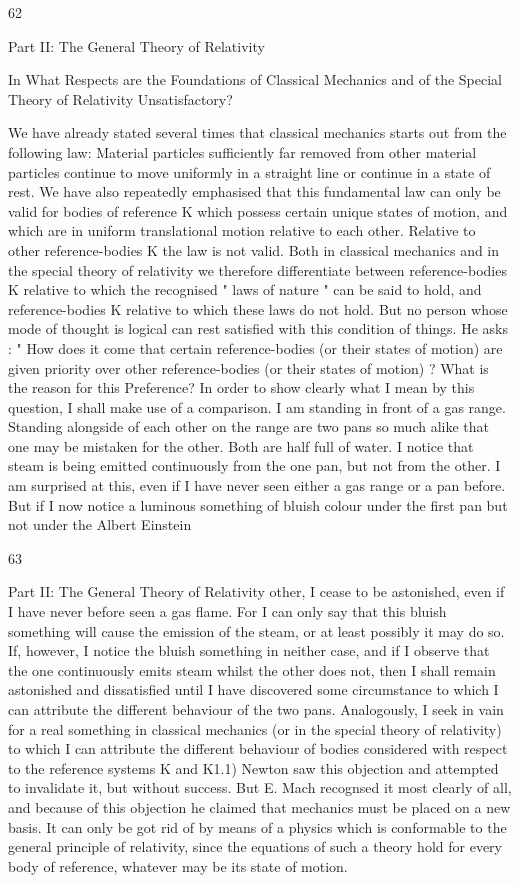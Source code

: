 \documentclass{article}
\begin{document}
62

Part II: The General Theory of Relativity

In What Respects are the
Foundations of Classical
Mechanics and of the Special
Theory of Relativity
Unsatisfactory?

We have already stated several times that classical mechanics starts out from the
following law: Material particles sufficiently far removed from other material particles
continue to move uniformly in a straight line or continue in a state of rest. We have also
repeatedly emphasised that this fundamental law can only be valid for bodies of reference K
which possess certain unique states of motion, and which are in uniform translational
motion relative to each other. Relative to other reference-bodies K the law is not valid. Both
in classical mechanics and in the special theory of relativity we therefore differentiate
between reference-bodies K relative to which the recognised " laws of nature " can be said
to hold, and reference-bodies K relative to which these laws do not hold.
But no person whose mode of thought is logical can rest satisfied with this condition of
things. He asks : " How does it come that certain reference-bodies (or their states of motion)
are given priority over other reference-bodies (or their states of motion) ? What is the
reason for this Preference? In order to show clearly what I mean by this question, I shall
make use of a comparison.
I am standing in front of a gas range. Standing alongside of each other on the range are
two pans so much alike that one may be mistaken for the other. Both are half full of water. I
notice that steam is being emitted continuously from the one pan, but not from the other. I
am surprised at this, even if I have never seen either a gas range or a pan before. But if I
now notice a luminous something of bluish colour under the first pan but not under the
Albert Einstein

63

Part II: The General Theory of Relativity
other, I cease to be astonished, even if I have never before seen a gas flame. For I can only
say that this bluish something will cause the emission of the steam, or at least possibly it
may do so. If, however, I notice the bluish something in neither case, and if I observe that
the one continuously emits steam whilst the other does not, then I shall remain astonished
and dissatisfied until I have discovered some circumstance to which I can attribute the
different behaviour of the two pans.
Analogously, I seek in vain for a real something in classical mechanics (or in the special
theory of relativity) to which I can attribute the different behaviour of bodies considered
with respect to the reference systems K and K1.1) Newton saw this objection and attempted
to invalidate it, but without success. But E. Mach recognsed it most clearly of all, and
because of this objection he claimed that mechanics must be placed on a new basis. It can
only be got rid of by means of a physics which is conformable to the general principle of
relativity, since the equations of such a theory hold for every body of reference, whatever
may be its state of motion.
\end{document}
